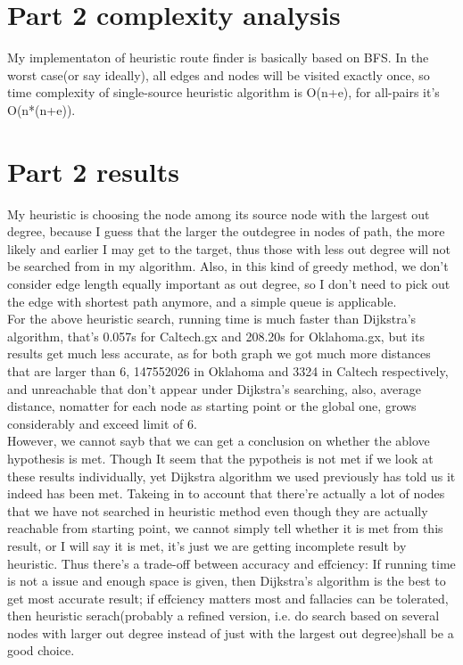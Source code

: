 \documentclass{article}
\begin{document}

\section{Part 2 complexity analysis}
\label{sec:complexity2}
My implementaton of heuristic route finder is basically based on BFS. In the worst case(or say ideally), all edges and nodes will be visited exactly once, so time complexity of single-source heuristic algorithm is O(n+e), for all-pairs it's O(n*(n+e)).

\section{Part 2 results}
\label{sec:part2}
My heuristic is choosing the node among its source node with the largest out degree, because I guess that the larger the outdegree in nodes of path, the more likely and earlier I may get to the target, thus those with less out degree will not be searched from in my algorithm. Also, in this kind of greedy method, we don't consider edge length equally important as out degree, so I don't need to pick out the edge with shortest path anymore, and a simple queue is applicable.\\
For the above heuristic search, running time is much faster than Dijkstra's algorithm, that's 0.057s for Caltech.gx and 208.20s for Oklahoma.gx, but its results get much less accurate, as for both graph we got much more distances that are larger than 6, 147552026 in Oklahoma and 3324 in Caltech respectively, and unreachable that don't appear under Dijkstra's searching, also, average distance, nomatter for each node as starting point or the global one, grows considerably and exceed limit of 6.\\
However, we cannot sayb that we can get a conclusion on whether the ablove hypothesis is met. Though It seem that the pypotheis is not met if we look at these results individually, yet Dijkstra algorithm we used previously has told us it indeed has been met. Takeing in to account that there're actually a lot of nodes that we have not searched in heuristic method even though they are actually reachable from starting point, we cannot simply tell whether it is met from this result, or I will say it is met, it's just we are getting incomplete result by heuristic.
Thus there's a trade-off between accuracy and effciency: If running time is not a issue and enough space is given, then Dijkstra's algorithm is the best to get most accurate result; if effciency matters most and fallacies can be tolerated, then heuristic serach(probably a refined version, i.e. do search based on several nodes with larger out degree instead of just with the largest out degree)shall be a good choice.
\end{document}
